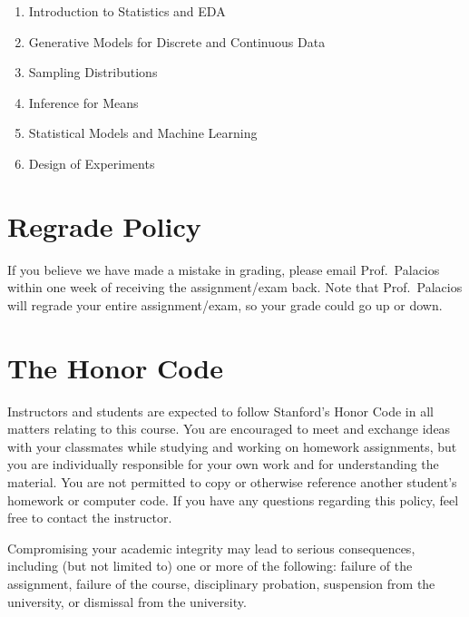\documentclass[
  letterpaper,
  DIV=11,
  numbers=noendperiod]{scrreprt}
\providecommand{\tightlist}{%
  \setlength{\itemsep}{0pt}\setlength{\parskip}{0pt}}
\begin{document}
\begin{enumerate}
\def\labelenumi{\arabic{enumi}.}
\tightlist
\item
  Introduction to Statistics and EDA\\
\item
  Generative Models for Discrete and Continuous Data\\
\item
  Sampling Distributions\\
\item
  Inference for Means\\
\item
  Statistical Models and Machine Learning\\
\item
  Design of Experiments
\end{enumerate}

\section*{Regrade Policy}\label{regrade-policy}


If you believe we have made a mistake in grading, please email
Prof.~Palacios within one week of receiving the assignment/exam back.
Note that Prof.~Palacios will regrade your entire assignment/exam, so
your grade could go up or down.

\section*{The Honor Code}\label{the-honor-code}


Instructors and students are expected to follow Stanford's Honor Code in
all matters relating to this course. You are encouraged to meet and
exchange ideas with your classmates while studying and working on
homework assignments, but you are individually responsible for your own
work and for understanding the material. You are not permitted to copy
or otherwise reference another student's homework or computer code. If
you have any questions regarding this policy, feel free to contact the
instructor.

Compromising your academic integrity may lead to serious consequences,
including (but not limited to) one or more of the following: failure of
the assignment, failure of the course, disciplinary probation,
suspension from the university, or dismissal from the university.
\end{document}
